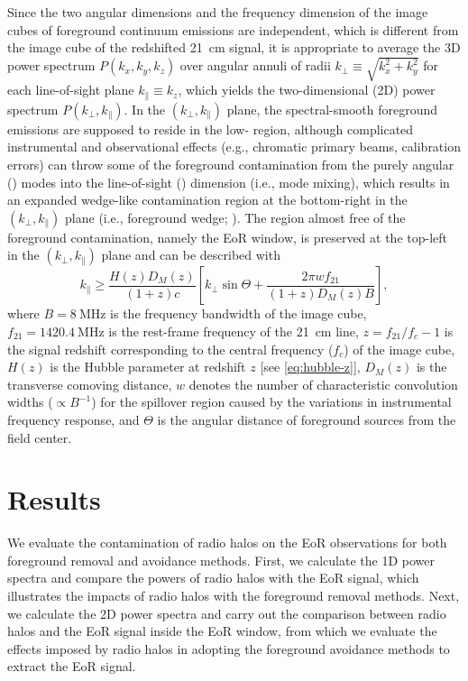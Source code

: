 \documentclass[twocolumn]{aastex62}
\newcommand{\klos}{\text{$k_{\parallel}$}}
\newcommand{\kperp}{\text{$k_{\bot}$}}
\begin{document}
Since the two angular dimensions and the frequency dimension of the image
cubes of foreground continuum emissions are independent, which is
different from the image cube of the redshifted 21~cm signal, it is
appropriate to average the 3D power spectrum $P(k_x, k_y, k_z)$
over angular annuli of radii $\kperp \equiv \sqrt{k_x^2 + k_y^2}$
for each line-of-sight plane $\klos \equiv k_z$, which yields the
two-dimensional (2D) power spectrum $P(\kperp, \klos)$.
In the $(\kperp, \klos)$ plane, the spectral-smooth foreground emissions
are supposed to reside in the low-\klos{} region, although complicated
instrumental and observational effects (e.g., chromatic primary beams,
calibration errors) can throw some of the foreground contamination from
the purely angular (\kperp) modes into the line-of-sight (\klos)
dimension (i.e., mode mixing), which results in an expanded wedge-like
contamination region at the bottom-right in the $(\kperp, \klos)$ plane
(i.e., foreground wedge; \citealt{datta2010,morales2012,liu2014}).
The region almost free of the foreground contamination, namely the
EoR window, is preserved at the top-left in the $(\kperp, \klos)$ plane
and can be described with \citep{thyagarajan2013}
\begin{equation}
  \label{eq:eor-window}
  \klos \geq \frac{H(z) D_{\!M}(z)}{(1+z) c} \left[
    \kperp \sin\Theta + \frac{2\pi w f_{21}}{(1+z) D_{\!M}(z) B} \right],
\end{equation}
where
$B = \SI{8}{\MHz}$ is the frequency bandwidth of the image cube,
$f_{21} = \SI{1420.4}{\MHz}$ is the rest-frame frequency of the 21~cm line,
$z = f_{21}/f_c - 1$ is the signal redshift corresponding to the central
frequency ($f_c$) of the image cube,
$H(z)$ is the Hubble parameter at redshift $z$ [see \autoref{eq:hubble-z}],
$D_{\!M}(z)$ is the transverse comoving distance,
$w$ denotes the number of characteristic convolution widths
($\propto B^{-1}$) for the spillover region caused by the variations in
instrumental frequency response,
and $\Theta$ is the angular distance of foreground sources from the
field center.


\section{Results}
\label{sec:results}

We evaluate the contamination of radio halos on the EoR observations for
both foreground removal and avoidance methods.
First, we calculate the 1D power spectra and compare the powers of
radio halos with the EoR signal, which illustrates the impacts of radio
halos with the foreground removal methods.
Next, we calculate the 2D power spectra and carry out the comparison
between radio halos and the EoR signal inside the EoR window, from
which we evaluate the effects imposed by radio halos in adopting the
foreground avoidance methods to extract the EoR signal.
\end{document}
